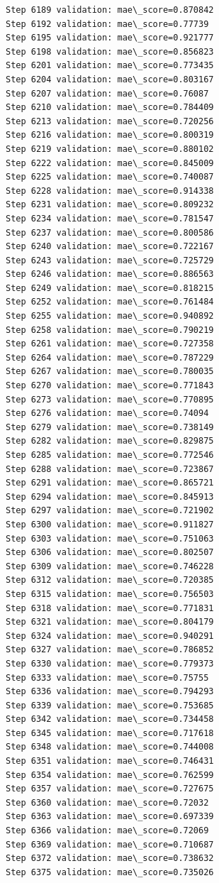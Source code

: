 \documentclass[11pt]{article}
\begin{document}
\begin{Verbatim}[commandchars=\\\{\}]
Step 6189 validation: mae\_score=0.870842
Step 6192 validation: mae\_score=0.77739
Step 6195 validation: mae\_score=0.921777
Step 6198 validation: mae\_score=0.856823
Step 6201 validation: mae\_score=0.773435
Step 6204 validation: mae\_score=0.803167
Step 6207 validation: mae\_score=0.76087
Step 6210 validation: mae\_score=0.784409
Step 6213 validation: mae\_score=0.720256
Step 6216 validation: mae\_score=0.800319
Step 6219 validation: mae\_score=0.880102
Step 6222 validation: mae\_score=0.845009
Step 6225 validation: mae\_score=0.740087
Step 6228 validation: mae\_score=0.914338
Step 6231 validation: mae\_score=0.809232
Step 6234 validation: mae\_score=0.781547
Step 6237 validation: mae\_score=0.800586
Step 6240 validation: mae\_score=0.722167
Step 6243 validation: mae\_score=0.725729
Step 6246 validation: mae\_score=0.886563
Step 6249 validation: mae\_score=0.818215
Step 6252 validation: mae\_score=0.761484
Step 6255 validation: mae\_score=0.940892
Step 6258 validation: mae\_score=0.790219
Step 6261 validation: mae\_score=0.727358
Step 6264 validation: mae\_score=0.787229
Step 6267 validation: mae\_score=0.780035
Step 6270 validation: mae\_score=0.771843
Step 6273 validation: mae\_score=0.770895
Step 6276 validation: mae\_score=0.74094
Step 6279 validation: mae\_score=0.738149
Step 6282 validation: mae\_score=0.829875
Step 6285 validation: mae\_score=0.772546
Step 6288 validation: mae\_score=0.723867
Step 6291 validation: mae\_score=0.865721
Step 6294 validation: mae\_score=0.845913
Step 6297 validation: mae\_score=0.721902
Step 6300 validation: mae\_score=0.911827
Step 6303 validation: mae\_score=0.751063
Step 6306 validation: mae\_score=0.802507
Step 6309 validation: mae\_score=0.746228
Step 6312 validation: mae\_score=0.720385
Step 6315 validation: mae\_score=0.756503
Step 6318 validation: mae\_score=0.771831
Step 6321 validation: mae\_score=0.804179
Step 6324 validation: mae\_score=0.940291
Step 6327 validation: mae\_score=0.786852
Step 6330 validation: mae\_score=0.779373
Step 6333 validation: mae\_score=0.75755
Step 6336 validation: mae\_score=0.794293
Step 6339 validation: mae\_score=0.753685
Step 6342 validation: mae\_score=0.734458
Step 6345 validation: mae\_score=0.717618
Step 6348 validation: mae\_score=0.744008
Step 6351 validation: mae\_score=0.746431
Step 6354 validation: mae\_score=0.762599
Step 6357 validation: mae\_score=0.727675
Step 6360 validation: mae\_score=0.72032
Step 6363 validation: mae\_score=0.697339
Step 6366 validation: mae\_score=0.72069
Step 6369 validation: mae\_score=0.710687
Step 6372 validation: mae\_score=0.738632
Step 6375 validation: mae\_score=0.735026

\end{Verbatim}
\end{document}
